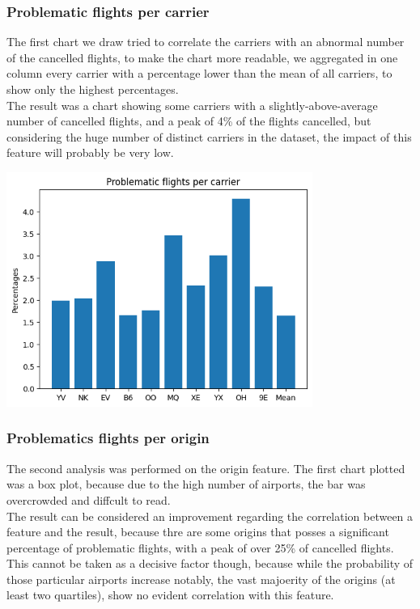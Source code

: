 \documentclass[
	letterpaper, %
	10pt, %
]{class}
\begin{document}
\subsubsection{Problematic flights per carrier}
The first chart we draw tried to correlate the carriers with an abnormal number of the cancelled flights, to make the chart more readable, we aggregated in one column every carrier with a percentage lower than the mean of all carriers, to show only the highest percentages.\\

The result was a chart showing some carriers with a slightly-above-average number of cancelled flights, and a peak of 4\% of the flights  cancelled, but considering the huge number of distinct carriers in the dataset, the impact of this feature will probably be very low.

\begin{center}
    \includegraphics[width=10cm]{../images/problematics_per_carrier.png}
\end{center}

\subsubsection{Problematics flights per origin}
The second analysis was performed on the origin feature.
The first chart plotted was a box plot, because due to the high number of airports, the bar was overcrowded and diffcult to read.\\

The result can be considered an improvement regarding the correlation between a feature and the result, because thre are some origins that posses a significant percentage
of problematic flights, with a peak of over 25\% of cancelled flights. This cannot be taken as a decisive factor though, because while the probability of those particular airports increase notably, the vast majoerity of the origins (at least two quartiles), show no evident correlation with this feature.
\end{document}
